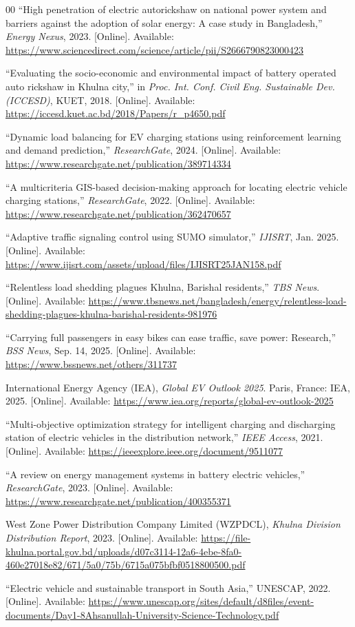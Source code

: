 \documentclass[conference]{IEEEtran}
\begin{document}
\begin{thebibliography}{00}
``High penetration of electric autorickshaw on national power system
and barriers against the adoption of solar energy: A case study in
Bangladesh,'' \textit{Energy Nexus}, 2023. [Online]. Available:
\url{https://www.sciencedirect.com/science/article/pii/S2666790823000423}

``Evaluating the socio-economic and environmental impact of battery
operated auto rickshaw in Khulna city,'' in \textit{Proc. Int. Conf.
Civil Eng. Sustainable Dev. (ICCESD)}, KUET, 2018. [Online]. Available:
\url{https://iccesd.kuet.ac.bd/2018/Papers/r_p4650.pdf}

``Dynamic load balancing for EV charging stations using reinforcement
learning and demand prediction,'' \textit{ResearchGate}, 2024.
[Online]. Available:
\url{https://www.researchgate.net/publication/389714334}

``A multicriteria GIS-based decision-making approach for locating
electric vehicle charging stations,'' \textit{ResearchGate}, 2022.
[Online]. Available:
\url{https://www.researchgate.net/publication/362470657}

``Adaptive traffic signaling control using SUMO simulator,''
\textit{IJISRT}, Jan. 2025. [Online]. Available:
\url{https://www.ijisrt.com/assets/upload/files/IJISRT25JAN158.pdf}

``Relentless load shedding plagues Khulna, Barishal residents,''
\textit{TBS News}. [Online]. Available:
\url{https://www.tbsnews.net/bangladesh/energy/relentless-load-shedding-plagues-khulna-barishal-residents-981976}

``Carrying full passengers in easy bikes can ease traffic, save power:
Research,'' \textit{BSS News}, Sep. 14, 2025. [Online]. Available:
\url{https://www.bssnews.net/others/311737}

International Energy Agency (IEA), \textit{Global EV Outlook 2025}.
Paris, France: IEA, 2025. [Online]. Available:
\url{https://www.iea.org/reports/global-ev-outlook-2025}

``Multi-objective optimization strategy for intelligent charging and
discharging station of electric vehicles in the distribution network,''
\textit{IEEE Access}, 2021. [Online]. Available:
\url{https://ieeexplore.ieee.org/document/9511077}

``A review on energy management systems in battery electric vehicles,''
\textit{ResearchGate}, 2023. [Online]. Available:
\url{https://www.researchgate.net/publication/400355371}

West Zone Power Distribution Company Limited (WZPDCL), \textit{Khulna
Division Distribution Report}, 2023. [Online]. Available:
\url{https://file-khulna.portal.gov.bd/uploads/d07c3114-12a6-4ebe-8fa0-460e27018e82/671/5a0/75b/6715a075bfbf0518800500.pdf}

``Electric vehicle and sustainable transport in South Asia,'' UNESCAP,
2022. [Online]. Available:
\url{https://www.unescap.org/sites/default/d8files/event-documents/Day1-8Ahsanullah-University-Science-Technology.pdf}

\end{thebibliography}
\end{document}
